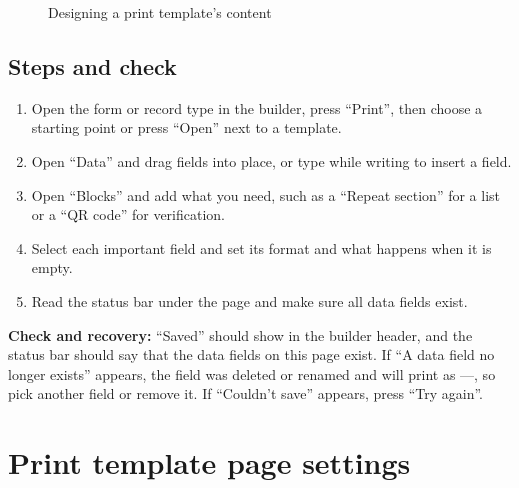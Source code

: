 \begin{figure}[H]
\centering
{}
\rclegend
\caption{Designing a print template's content}
\label{fig:builder-print-builder-flow}
\end{figure}

\subsection{Steps and check}
\begin{enumerate}
\item Open the form or record type in the builder, press “Print”, then choose a starting point or press “Open” next to a template.
\item Open “Data” and drag fields into place, or type \en{/} while writing to insert a field.
\item Open “Blocks” and add what you need, such as a “Repeat section” for a list or a “QR code” for verification.
\item Select each important field and set its format and what happens when it is empty.
\item Read the status bar under the page and make sure all data fields exist.
\end{enumerate}

\textbf{Check and recovery:} “Saved” should show in the builder header, and the status bar should say that the data fields on this page exist. If “A data field no longer exists” appears, the field was deleted or renamed and will print as —, so pick another field or remove it. If “Couldn’t save” appears, press “Try again”.

\clearpage
\section{Print template page settings}
\label{sec:builder-feature-print-page}

